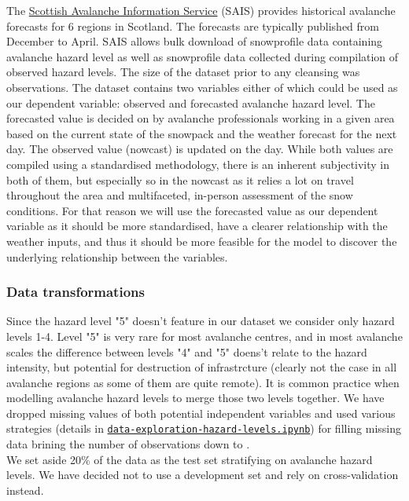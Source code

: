 \documentclass{article}
\begin{document}
	The \href{https://www.sais.gov.uk/forecast-archive/}{Scottish Avalanche Information Service} (SAIS) provides historical avalanche forecasts for 6 regions in Scotland. The forecasts are typically published from December to April. SAIS allows bulk download of snowprofile data containing avalanche hazard level as well as snowprofile data collected during compilation of observed hazard levels. The size of the dataset prior to any cleansing was observations.
	\newline
	The dataset contains two variables either of which could be used as our dependent variable: observed and forecasted avalanche hazard level.
	The forecasted value is decided on by avalanche professionals working in a given area based on the current state of the snowpack and the weather forecast for the next day.
	The observed value (nowcast) is updated on the day.
	\newline
	While both values are compiled using a standardised methodology, there is an inherent subjectivity in both of them, but especially so in the nowcast as it relies a lot on travel throughout the area and multifaceted, in-person assessment of the snow conditions. For that reason we will use the forecasted value as our dependent variable as it should be more standardised, have a clearer relationship with the weather inputs, and thus it should be more feasible for the model to discover the underlying relationship between the variables.

\subsubsection{Data transformations}
	Since the hazard level "5" doesn't feature in our dataset we consider only hazard levels 1-4. Level "5" is very rare for most avalanche centres, and in most avalanche scales the difference between levels "4" and "5" doens't relate to the hazard intensity, but potential for destruction of infrastrcture (clearly not the case in all avalanche regions as some of them are quite remote). It is common practice when modelling avalanche hazard levels to merge those two levels together. 
	We have dropped missing values of both potential independent variables and used various strategies (details in \href{https://github.com/witgaw/avalanche-danger-level-forecast/blob/main/src/data-exploration-hazard-levels.ipynb}{\texttt{data-exploration-hazard-levels.ipynb}}) for filling missing data brining the number of observations down to \unskip.\\
	\newline 
	We set aside 20\% of the data as the test set stratifying on avalanche hazard levels. We have decided not to use a development set and rely on cross-validation instead.
\end{document}
